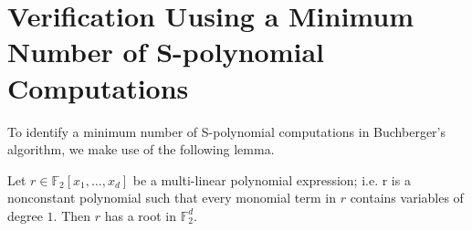 \section{Verification Uusing a Minimum Number of S-polynomial Computations}







To identify a minimum number of S-polynomial computations in
Buchberger's algorithm, we make use of the following lemma. 
\begin{Lemma}\label{lem:root2}
Let $r \in \mathbb{F}_2[x_1, \dots, x_d]$ be a multi-linear polynomial
expression; i.e. r is a nonconstant polynomial such that every
monomial term in $r$ contains variables of degree $1$. Then $r$ has a
root in $\mathbb{F}_2^d$. 
\end{Lemma}

